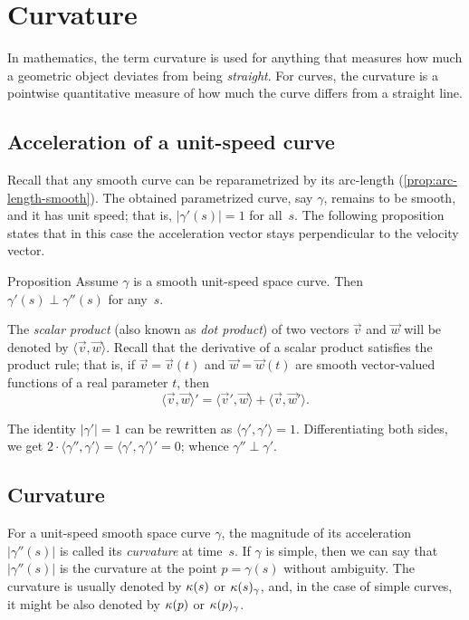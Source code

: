 \chapter{Curvature}
\label{chap:curve-curvature}

In mathematics, the term curvature is used for anything that measures how much a geometric object deviates from being \textit{straight}.
For curves, the curvature is a pointwise quantitative measure of how much the curve differs from a straight line.




\section{Acceleration of a unit-speed curve}

Recall that any smooth curve can be reparametrized by its arc-length (\ref{prop:arc-length-smooth}).
The obtained parametrized curve, say $\gamma$, remains to be smooth, and it has unit speed; 
that is, $|\gamma'(s)|=1$ for all~$s$.
The following proposition states that in this case
the acceleration vector stays perpendicular to the velocity vector.

\begin{thm}{Proposition}\label{prop:a'-pertp-a''}
Assume $\gamma$ is a smooth unit-speed space curve.
Then $\gamma'(s)\perp \gamma''(s)$ for any~$s$.
\end{thm}

The \emph{scalar product} (also known as \emph{dot product}) of two vectors $\vec v$ and $\vec w$ will be denoted by $\langle \vec v,\vec w\rangle$.
Recall that the derivative of a scalar product satisfies the product rule;
that is, if $\vec v=\vec v(t)$ and $\vec w=\vec w(t)$ are smooth vector-valued functions of a real parameter $t$, then
\[\langle \vec v,\vec w\rangle'=\langle \vec v',\vec w\rangle+\langle \vec v,\vec w'\rangle.\]

The identity $|\gamma'|=1$ can be rewritten as $\langle\gamma',\gamma'\rangle=1$.
Differentiating both sides, we get
$2\cdot\langle\gamma'',\gamma'\rangle=\langle\gamma',\gamma'\rangle'=0$;
whence $\gamma''\perp\gamma'$.
\qeds

\section{Curvature}\label{sec:curvature}

For a unit-speed smooth space curve $\gamma$, the magnitude of its acceleration $|\gamma''(s)|$ is called its \emph{curvature} at  time~$s$.
If $\gamma$ is simple, then we can say that $|\gamma''(s)|$ is the curvature at the point $p=\gamma(s)$ without ambiguity.
The curvature is usually denoted by $\kappa(s)$ or $\kappa(s)_\gamma$, and, in the case of simple curves, it might be also denoted by $\kappa(p)$ or $\kappa(p)_\gamma$.



